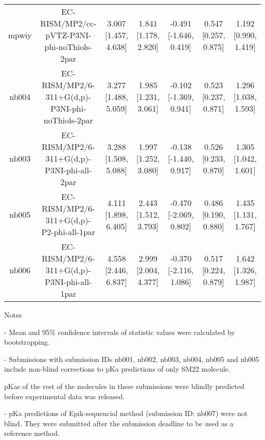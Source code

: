 \documentclass{article}
\begin{document}
\begin{center}
\begin{longtable}{|ccccccc|}
 mpwiy &         EC-RISM/MP2/cc-pVTZ-P3NI-phi-noThiols-2par &    3.007 [1.457, 4.638] &   1.841 [1.178, 2.820] &    -0.491 [-1.646, 0.419] &  0.547 [0.257, 0.875] &    1.192 [0.990, 1.419] \\
 nb004 &    EC-RISM/MP2/6-311+G(d,p)-P3NI-phi-noThiols-2par &    3.277 [1.488, 5.059] &   1.985 [1.231, 3.061] &    -0.102 [-1.369, 0.941] &  0.523 [0.237, 0.871] &    1.296 [1.038, 1.593] \\
 nb003 &         EC-RISM/MP2/6-311+G(d,p)-P3NI-phi-all-2par &    3.288 [1.508, 5.088] &   1.997 [1.252, 3.080] &    -0.138 [-1.440, 0.917] &  0.526 [0.233, 0.870] &    1.305 [1.042, 1.601] \\
 nb005 &           EC-RISM/MP2/6-311+G(d,p)-P2-phi-all-1par &    4.111 [1.898, 6.405] &   2.443 [1.512, 3.793] &    -0.470 [-2.069, 0.802] &  0.486 [0.190, 0.880] &    1.435 [1.131, 1.767] \\
 nb006 &         EC-RISM/MP2/6-311+G(d,p)-P3NI-phi-all-1par &    4.558 [2.446, 6.837] &   2.999 [2.004, 4.377] &    -0.370 [-2.116, 1.086] &  0.517 [0.224, 0.879] &    1.642 [1.326, 1.987] \\
\end{longtable}
\end{center}

Notes

- Mean and 95\% confidence intervals of statistic values were calculated by bootstrapping.

- Submissions with submission IDs nb001, nb002, nb003, nb004, nb005 and nb005 include non-blind corrections to pKa predictions of only SM22 molecule.

pKas of the rest of the molecules in these submissions were blindly predicted before experimental data was released.

- pKa predictions of Epik-sequencial method (submission ID: nb007) were not blind. They were submitted after the submission deadline to be used as a reference method.
\end{document}

